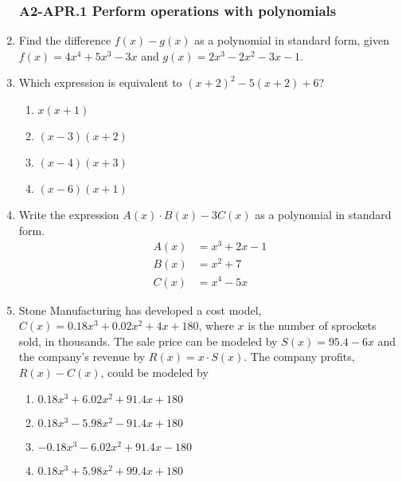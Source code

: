 \documentclass[12pt, twoside]{article}
\begin{document}
\begin{enumerate}[itemsep=0.5cm]
\newpage
\subsubsection*{A2-APR.1 Perform operations with polynomials}
\item Find the difference $f(x)-g(x)$ as a polynomial in standard form, given \\[0.25cm]
    $f(x)=4x^4+5x^3-3x$ and $g(x)=2x^3-2x^2-3x-1$. \vspace{5cm}


\item Which expression is equivalent to $(x + 2)^2 - 5(x + 2) + 6$?
\begin{enumerate}
        \item $x(x + 1)$
        \item $(x - 3)(x + 2)$
        \item $(x - 4)(x + 3)$
        \item $(x - 6)(x + 1)$
    \end{enumerate}

\newpage
\item Write the expression $A(x) \cdot B(x) - 3C(x)$ as a polynomial in standard form. %
\begin{align*}
    A(x) &= x^3 + 2x - 1 \\
    B(x) &= x^2 + 7 \\
    C(x) &= x^4 - 5x
\end{align*} \vspace{5cm}

\item Stone Manufacturing has developed a cost model, $C(x) = 0.18x^3 + 0.02x^2 + 4x + 180$, where $x$ is the number of sprockets sold, in thousands. The sale price can be modeled by $S(x) = 95.4 - 6x$ and the company’s revenue by $R(x) = x \cdot S(x)$. The company profits, $R(x) - C(x)$, could be modeled by %
\begin{enumerate}
    \item $0.18x^3 + 6.02x^2 + 91.4x + 180$
    \item $0.18x^3 - 5.98x^2 - 91.4x + 180$
    \item $-0.18x^3 - 6.02x^2 + 91.4x - 180$
    \item $0.18x^3 + 5.98x^2 + 99.4x + 180$
\end{enumerate}


\end{enumerate}
\end{document}
